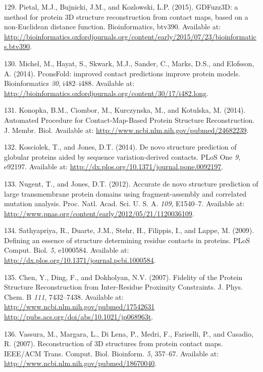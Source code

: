\documentclass[11pt,a4paper,twoside]{book}
\theoremstyle{definition}
\theoremstyle{definition}
\theoremstyle{remark}
\begin{document}
\hypertarget{ref-Pietal2015a}{}
129. Pietal, M.J., Bujnicki, J.M., and Kozlowski, L.P. (2015). GDFuzz3D:
a method for protein 3D structure reconstruction from contact maps,
based on a non-Euclidean distance function. Bioinformatics, btv390.
Available at:
\url{http://bioinformatics.oxfordjournals.org/content/early/2015/07/23/bioinformatics.btv390}.

\hypertarget{ref-Michel2014}{}
130. Michel, M., Hayat, S., Skwark, M.J., Sander, C., Marks, D.S., and
Elofsson, A. (2014). PconsFold: improved contact predictions improve
protein models. Bioinformatics \emph{30}, i482--i488. Available at:
\url{http://bioinformatics.oxfordjournals.org/content/30/17/i482.long}.

\hypertarget{ref-Konopka2014}{}
131. Konopka, B.M., Ciombor, M., Kurczynska, M., and Kotulska, M.
(2014). Automated Procedure for Contact-Map-Based Protein Structure
Reconstruction. J. Membr. Biol. Available at:
\url{http://www.ncbi.nlm.nih.gov/pubmed/24682239}.

\hypertarget{ref-Kosciolek2014}{}
132. Kosciolek, T., and Jones, D.T. (2014). De novo structure prediction
of globular proteins aided by sequence variation-derived contacts. PLoS
One \emph{9}, e92197. Available at:
\url{http://dx.plos.org/10.1371/journal.pone.0092197}.

\hypertarget{ref-Nugent2012}{}
133. Nugent, T., and Jones, D.T. (2012). Accurate de novo structure
prediction of large transmembrane protein domains using
fragment-assembly and correlated mutation analysis. Proc. Natl. Acad.
Sci. U. S. A. \emph{109}, E1540--7. Available at:
\url{http://www.pnas.org/content/early/2012/05/21/1120036109}.

\hypertarget{ref-Sathyapriya2009}{}
134. Sathyapriya, R., Duarte, J.M., Stehr, H., Filippis, I., and Lappe,
M. (2009). Defining an essence of structure determining residue contacts
in proteins. PLoS Comput. Biol. \emph{5}, e1000584. Available at:
\url{http://dx.plos.org/10.1371/journal.pcbi.1000584}.

\hypertarget{ref-Chen2007}{}
135. Chen, Y., Ding, F., and Dokholyan, N.V. (2007). Fidelity of the
Protein Structure Reconstruction from Inter-Residue Proximity
Constraints. J. Phys. Chem. B \emph{111}, 7432--7438. Available at:
\href{http://www.ncbi.nlm.nih.gov/pubmed/17542631\%20http://pubs.acs.org/doi/abs/10.1021/jp068963t}{http://www.ncbi.nlm.nih.gov/pubmed/17542631 http://pubs.acs.org/doi/abs/10.1021/jp068963t}.

\hypertarget{ref-Vassura2007}{}
136. Vassura, M., Margara, L., Di Lena, P., Medri, F., Fariselli, P.,
and Casadio, R. (2007). Reconstruction of 3D structures from protein
contact maps. IEEE/ACM Trans. Comput. Biol. Bioinform. \emph{5},
357--67. Available at:
\url{http://www.ncbi.nlm.nih.gov/pubmed/18670040}.
\end{document}

